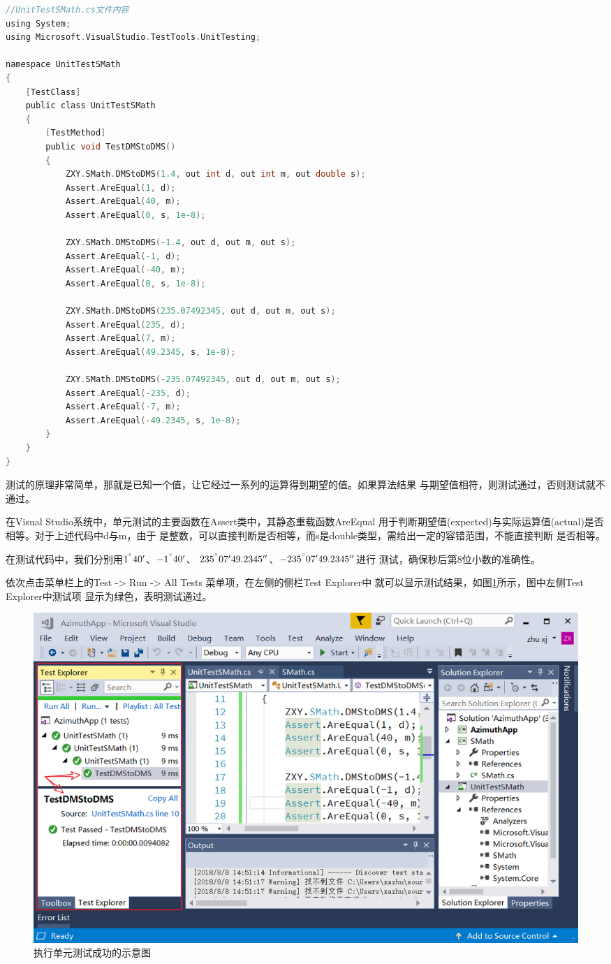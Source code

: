 \begin{lstlisting}[language=C]
//UnitTestSMath.cs文件内容
using System;
using Microsoft.VisualStudio.TestTools.UnitTesting;

namespace UnitTestSMath
{
    [TestClass]
    public class UnitTestSMath
    {
        [TestMethod]
        public void TestDMStoDMS()
        {
            ZXY.SMath.DMStoDMS(1.4, out int d, out int m, out double s);
            Assert.AreEqual(1, d);
            Assert.AreEqual(40, m);
            Assert.AreEqual(0, s, 1e-8);

            ZXY.SMath.DMStoDMS(-1.4, out d, out m, out s);
            Assert.AreEqual(-1, d);
            Assert.AreEqual(-40, m);
            Assert.AreEqual(0, s, 1e-8);

            ZXY.SMath.DMStoDMS(235.07492345, out d, out m, out s);
            Assert.AreEqual(235, d);
            Assert.AreEqual(7, m);
            Assert.AreEqual(49.2345, s, 1e-8);

            ZXY.SMath.DMStoDMS(-235.07492345, out d, out m, out s);
            Assert.AreEqual(-235, d);
            Assert.AreEqual(-7, m);
            Assert.AreEqual(-49.2345, s, 1e-8);
        }
    }
}
\end{lstlisting}

测试的原理非常简单，那就是已知一个值，让它经过一系列的运算得到期望的值。如果算法结果
与期望值相符，则测试通过，否则测试就不通过。

在Visual Studio系统中，单元测试的主要函数在Assert类中，其静态重载函数AreEqual
用于判断期望值(expected)与实际运算值(actual)是否相等。对于上述代码中d与m，由于
是整数，可以直接判断是否相等，而s是double类型，需给出一定的容错范围，不能直接判断
是否相等。

在测试代码中，我们分别用$1^{^\circ} 40'$、$-1^{^\circ} 40'$、
$235^{^\circ} 07'49.2345''$、$-235^{^\circ} 07'49.2345''$进行
测试，确保秒后第8位小数的准确性。

依次点击菜单栏上的Test -> Run -> All Tests 菜单项，在左侧的侧栏Test Explorer中
就可以显示测试结果，如图\ref{fig:AzimuthApp8}所示，图中左侧Test Explorer中测试项
显示为绿色，表明测试通过。

\begin{figure}[htbp]
    \centering
    \includegraphics[scale=0.65]{surveybase/AzimuthApp8.png}
    \caption{执行单元测试成功的示意图}
    \label{fig:AzimuthApp8}
\end{figure}

